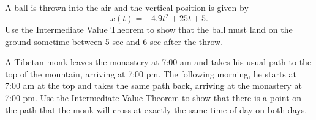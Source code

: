 \documentclass[12pt]{amsart}
\begin{document}
\newpage


\begin{question}
	A ball is thrown into the air and the vertical position is given by
	$$ x(t) = -4.9t^2 + 25t + 5 .$$
	Use the Intermediate Value Theorem to show that the ball must land on the ground sometime between 5 sec and 6 sec after the throw.
\end{question}


\vspace{5cm}

\begin{question}
	A Tibetan monk leaves the monastery at 7:00 am and
	takes his usual path to the top of the mountain, arriving at
	7:00 pm. The following morning, he starts at 7:00 am at the
	top and takes the same path back, arriving at the monastery
	at 7:00 pm. Use the Intermediate Value Theorem to show
	that there is a point on the path that the monk will cross at
	exactly the same time of day on both days.
\end{question}

\printbibliography
\end{document}
